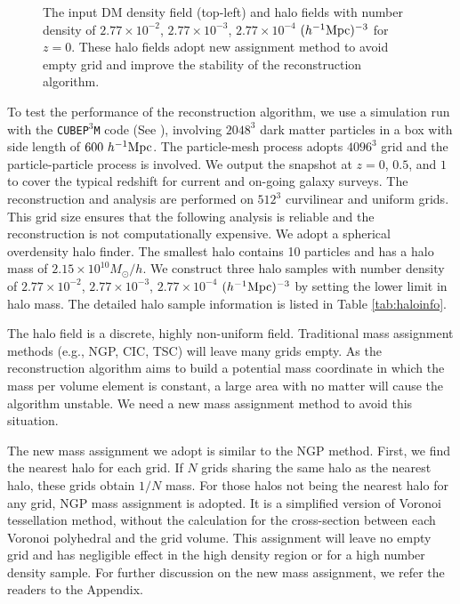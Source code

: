 \documentclass[iop]{emulateapj}
\newcommand{\mpch}{h^{-1} {\rm Mpc}}
\newcommand{\Msun}{M_{\odot}}
\begin{document}
{%
\begin{figure*}
\epsfxsize=18cm
\caption{The input DM density field (top-left) and halo fields with number density of $2.77\times 10^{-2}$,
$2.77\times 10^{-3}$, $2.77\times 10^{-4}$ $(\mpch)^{-3}$ for $z=0$.
These halo fields adopt new assignment method to avoid empty grid and improve the stability of the reconstruction algorithm.}
\label{fig:maps}
\end{figure*}

To test the performance of the reconstruction algorithm,
we use a simulation run with the \texttt{CUBEP$^3$M} code (See \cite{cubep3m}), involving $2048^3$ dark matter particles in a box with side length of $600\ \mpch$.
The particle-mesh process adopts $4096^3$ grid and the particle-particle process is involved.
We output the snapshot at $z=0$, $0.5$, and $1$ to cover the typical redshift for current and on-going galaxy surveys.
The reconstruction and analysis are performed on $512^3$ curvilinear and uniform grids.
This grid size ensures that the following analysis is reliable and the reconstruction is not computationally expensive.
We adopt a spherical overdensity halo finder.
The smallest halo contains 10 particles and has a halo mass of $2.15\times 10^{10}\Msun/h$.
We construct three halo samples with number density of $2.77\times 10^{-2}$, $2.77\times 10^{-3}$, $2.77\times 10^{-4}$ $(\mpch)^{-3}$ by setting the lower limit in halo mass.
The detailed halo sample information is listed in Table \ref{tab:haloinfo}.

The halo field is a discrete, highly non-uniform field.
Traditional mass assignment methods (e.g., NGP, CIC, TSC) will leave many grids empty.
As the reconstruction algorithm aims to build a potential mass coordinate in which the mass per volume element is constant, 
a large area with no matter will cause the algorithm unstable.
We need a new mass assignment method to avoid this situation.

The new mass assignment we adopt is similar to the NGP method.
First, we find the nearest halo for each grid.
If $N$ grids sharing the same halo as the nearest halo, these grids obtain $1/N$ mass.
For those halos not being the nearest halo for any grid, NGP mass assignment is adopted.
It is a simplified version of Voronoi tessellation method, without the calculation for the cross-section between each Voronoi polyhedral and the grid volume.
This assignment will leave no empty grid and has negligible effect in the high density region or for a high number density sample.
For further discussion on the new mass assignment, we refer the readers to the Appendix.

}
\end{document}

